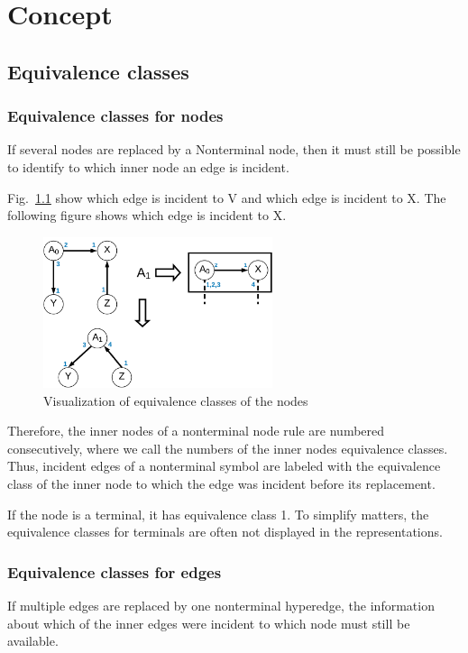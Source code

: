 \chapter{Concept}
\label{ch:concept}

\section*{Equivalence classes}
\subsection*{Equivalence classes for nodes}

If several nodes are replaced by a Nonterminal node, then it must still be possible to identify to which inner node an edge is incident.

Fig.~\ref{fig:nodeEC} show which edge is incident to V and which edge is incident to X. The following figure shows which edge is incident to X.
\begin{figure}[h]
	\centering
	\includegraphics[width=0.6\textwidth]{chapters/imgConcept/nodeEC}
	\caption{Visualization of equivalence classes of the nodes}
	\label{fig:nodeEC}
\end{figure}

Therefore, the inner nodes of a nonterminal node rule are numbered consecutively, where we call the numbers of the inner nodes equivalence classes. Thus, incident edges of a nonterminal symbol are labeled with the equivalence class of the inner node to which the edge was incident before its replacement. 

If the node is a terminal, it has equivalence class 1. To simplify matters, the equivalence classes for terminals are often not displayed in the representations.

\subsection*{Equivalence classes for edges}
If multiple edges are replaced by one nonterminal hyperedge, the information about which of the inner edges were incident to which node must still be available.

